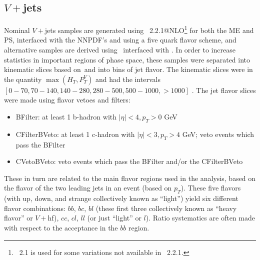 
\subsection{$V+$jets}
Nominal $V+$jets samples are generated using \sherpa\, 2.2.1@NLO\footnote{\sherpa\, 2.1 is used for some variations not available in \sherpa\, 2.2.1.} \cite{modeling23} for both the ME and PS, interfaced with the NNPDF's and using a five quark flavor scheme, and alternative samples are derived using \mg\, interfaced with .  In order to increase statistics in important regions of phase space, these samples were separated into kinematic slices based on \ptv\,and into bins of jet flavor.  The kinematic slices were in the quantity $\max\left(H_T,P_T^V\right)$ and had the intervals $\left[0-70, 70-140, 140-280, 280-500, 500-1000, >1000\right]$ \GeV.  The jet flavor slices were made using flavor vetoes and filters:
\begin{itemize}
\item BFilter: at least 1 b-hadron with $\left|\eta\right|<4, p_T >0$ GeV
\item CFilterBVeto: at least 1 c-hadron with $\left|\eta\right|<3, p_T >4$ GeV; veto events which pass the BFilter
\item CVetoBVeto: veto events which pass the BFilter and/or the CFilterBVeto
\end{itemize}

These in turn are related to the main flavor regions used in the analysis, based on the flavor of the two leading jets in an event (based on $p_T$).  These five flavors (with up, down, and strange collectively known as ``light'') yield six different flavor combinations: $bb$, $bc$, $bl$ (these first three collectively known as ``heavy flavor'' or $V+$hf), $cc$, $cl$, $ll$ (or just ``light'' or $l$).  Ratio systematics are often made with respect to the acceptance in the $bb$ region.

